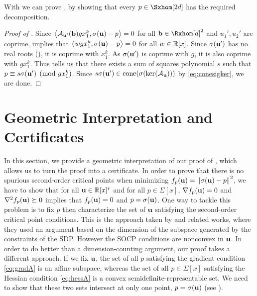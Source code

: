 \documentclass[final,onefignum,onetabnum]{siamart220329}
\begin{document}
With  we can prove , by
showing that every $p \in \Sxhom[2d]$ has the required decomposition.

\begin{proof}[Proof of ]
  Since $\left\langle \mathcal{A}_{\boldsymbol{\mathbf{u}}'}(\boldsymbol{\mathbf{b}}) g x_1^{k}, \sigma(\boldsymbol{\mathbf{u}}) - p \right\rangle = 0$ for all
  $\vecp{b} \in \Rxhom[d]^2$ and $u_1', u_2'$ are coprime,
   implies that
  $\left\langle wgx_1^{k} , \sigma(\boldsymbol{\mathbf{u}}) - p \right\rangle = 0$ for all $w \in \mathbb{R}[x]$. Since
  $\sigma(\boldsymbol{\mathbf{u}}')$ has no real roots (), it is coprime
  with $x_1^k$. As $\sigma(\boldsymbol{\mathbf{u}}')$ is coprime with $g$, it is also coprime
  with $gx_1^k$. Thus  tells us that there exists a sum of
  squares polynomial $s$ such that $p \equiv s \sigma(\boldsymbol{\mathbf{u}}')
  \pmod{gx_1^k}$. Since $s \sigma(\boldsymbol{\mathbf{u}}') \in \operatorname{cone}(\sigma(\ker(\mathcal{A}_{\boldsymbol{\mathbf{u}}})))$ by
  \eqref{eq:conesigker}, we are done.
\end{proof}

\section{Geometric Interpretation and Certificates}
\label{sec:cert}
In this section, we provide a geometric interpretation of our proof of
, which allows us to turn the proof into a certificate. In order
to prove that there is no spurious second-order critical points when minimizing
$f_p(\boldsymbol{\mathbf{u}}) = \left\lVert \sigma(\boldsymbol{\mathbf{u}}) - p \right\lVert^2$, we have to show that for all
$\boldsymbol{\mathbf{u}} \in \mathbb{R}[x]^r$ and for all $p \in \Sigma[x]$, $\nabla f_p(\boldsymbol{\mathbf{u}}) = 0$
and $\nabla^2 f_p(\boldsymbol{\mathbf{u}}) \succeq 0$ implies that $f_p(\boldsymbol{\mathbf{u}}) = 0$ and
$p = \sigma(\boldsymbol{\mathbf{u}})$. One way to tackle this problem is to fix $p$ then
characterize the set of $\boldsymbol{\mathbf{u}}$ satisfying the second-order critical point
conditions. This is the approach taken by \cite{bhojanapalli2018smoothed} and
related works, where they used an argument based on the dimension of the
subspace generated by the constraints of the SDP. However the SOCP conditions
are nonconvex in $\boldsymbol{\mathbf{u}}$. In order to do better than a dimension-counting
argument, our proof takes a different approach. If we fix $\boldsymbol{\mathbf{u}}$, the set of
all $p$ satisfying the gradient condition \eqref{eq:gradA} is an affine
subspace, whereas the set of all $p \in \Sigma[x]$ satisfying the Hessian
condition \eqref{eq:hessA} is a convex semidefinite-representable set. We need
to show that these two sets intersect at only one point, $p = \sigma(\boldsymbol{\mathbf{u}})$
(see ).
\end{document}

